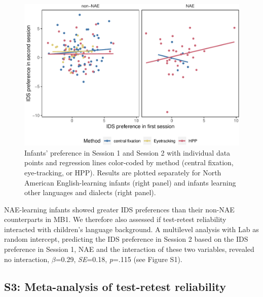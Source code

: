 \documentclass[
  man, donotrepeattitle,floatsintext]{apa6}
\begin{document}
\begin{figure}
\centering
\includegraphics{MB1T_supplement_files/figure-latex/fig1-1.pdf}
\caption{\label{fig:fig1}Infants' preference in Session 1 and Session 2 with individual data points and regression lines color-coded by method (central fixation, eye-tracking, or HPP). Results are plotted separately for North American English-learning infants (right panel) and infants learning other languages and dialects (right panel).}
\end{figure}

NAE-learning infants showed greater IDS preferences than their non-NAE counterparts in MB1. We therefore also assessed if test-retest reliability interacted with children's language background. A multilevel analysis with Lab as random intercept, predicting the IDS preference in Session 2 based on the IDS preference in Session 1, NAE and the interaction of these two variables, revealed no interaction, \(\beta\)=0.29, \emph{SE}=0.18, \emph{p}=.115 (see Figure S1).

\hypertarget{s3-meta-analysis-of-test-retest-reliability}{%
\subsection{S3: Meta-analysis of test-retest reliability}\label{s3-meta-analysis-of-test-retest-reliability}}
\end{document}
